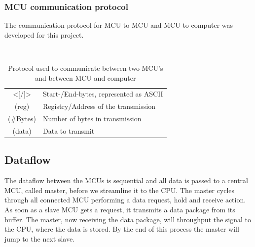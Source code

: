\subsubsection{MCU communication protocol}

The communication protocol for \ac{MCU} to \ac{MCU} and \ac{MCU} to computer was developed for this project.

\begin{table}[!htb]
  \centering
  
  \\[0.5em]
  \footnotesize
  \begin{tabular}{c@{:\hskip 0.5em}l}
    \toprule
    \large{\textcolor{WesMixL8qual6}{<[}/\textcolor{WesMixL8qual6}{]>}} & Start-/End-bytes, represented as \ac{ASCII}\\
    \textcolor{WesMixL8qual0}{\large (reg)} & Registry/Address of the transmission\\
    \textcolor{WesMixL8qual4}{\large (\#Bytes)} & Number of bytes in transmission\\
    \textcolor{WesMixL8qual5}{\large (data)} & Data to transmit\\
    \bottomrule
  \end{tabular}
\normalsize
  \caption[MCU communication protocol]{Protocol used to communicate between two MCU's and between MCU and computer%
    \label{tab:mcu_com_protocol}}
\end{table}





\subsection{Dataflow}

The dataflow between the \ac{MCU}s is sequential and all data is passed to a central \ac{MCU}, called master, before we streamline it to the \ac{CPU}. The master cycles through all connected \ac{MCU} performing a data request, hold and receive action. As soon as a slave \ac{MCU} gets a request, it transmits a data package from its buffer. The master, now receiving the data package, will throughput the signal to the \ac{CPU}, where the data is stored. By the end of this process the master will jump to the next slave.

